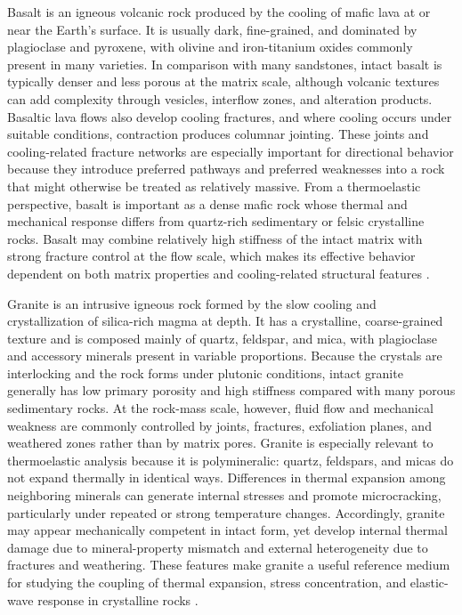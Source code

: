 Basalt is an igneous volcanic rock produced by the cooling of mafic lava at or near the Earth's surface. It is usually dark, fine-grained, and dominated by plagioclase and pyroxene, with olivine and iron-titanium oxides commonly present in many varieties. In comparison with many sandstones, intact basalt is typically denser and less porous at the matrix scale, although volcanic textures can add complexity through vesicles, interflow zones, and alteration products. Basaltic lava flows also develop cooling fractures, and where cooling occurs under suitable conditions, contraction produces columnar jointing. These joints and cooling-related fracture networks are especially important for directional behavior because they introduce preferred pathways and preferred weaknesses into a rock that might otherwise be treated as relatively massive. From a thermoelastic perspective, basalt is important as a dense mafic rock whose thermal and mechanical response differs from quartz-rich sedimentary or felsic crystalline rocks. Basalt may combine relatively high stiffness of the intact matrix with strong fracture control at the flow scale, which makes its effective behavior dependent on both matrix properties and cooling-related structural features \cite{earle2019,robertson1988,turcotte2014}.

Granite is an intrusive igneous rock formed by the slow cooling and crystallization of silica-rich magma at depth. It has a crystalline, coarse-grained texture and is composed mainly of quartz, feldspar, and mica, with plagioclase and accessory minerals present in variable proportions. Because the crystals are interlocking and the rock forms under plutonic conditions, intact granite generally has low primary porosity and high stiffness compared with many porous sedimentary rocks. At the rock-mass scale, however, fluid flow and mechanical weakness are commonly controlled by joints, fractures, exfoliation planes, and weathered zones rather than by matrix pores. Granite is especially relevant to thermoelastic analysis because it is polymineralic: quartz, feldspars, and micas do not expand thermally in identical ways. Differences in thermal expansion among neighboring minerals can generate internal stresses and promote microcracking, particularly under repeated or strong temperature changes. Accordingly, granite may appear mechanically competent in intact form, yet develop internal thermal damage due to mineral-property mismatch and external heterogeneity due to fractures and weathering. These features make granite a useful reference medium for studying the coupling of thermal expansion, stress concentration, and elastic-wave response in crystalline rocks \cite{earle2019,jaeger2007,robertson1988}.


